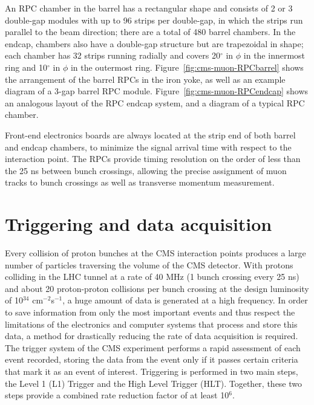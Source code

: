 An RPC chamber in the barrel has a rectangular shape and consists of 2 or 3 double-gap modules with up to 96 strips per double-gap, in which the strips run parallel to the beam direction; there are a total of 480 barrel chambers. In the endcap, chambers also have a double-gap structure but are trapezoidal in shape; each chamber has 32 strips running radially and covers 20$^{\circ}$ in $\phi$ in the innermost ring and 10$^{\circ}$ in $\phi$ in the outermost ring. Figure~\ref{fig:cms-muon-RPCbarrel} shows the arrangement of the barrel RPCs in the iron yoke, as well as an example diagram of a 3-gap barrel RPC module. Figure~\ref{fig:cms-muon-RPCendcap} shows an analogous layout of the RPC endcap system, and a diagram of a typical RPC chamber.

Front-end electronics boards are always located at the strip end of both barrel and endcap chambers, to minimize the signal arrival time with respect to the interaction point. The RPCs provide timing resolution on the order of less than the 25 ns between bunch crossings, allowing the precise assignment of muon tracks to bunch crossings as well as transverse momentum measurement.

\section{Triggering and data acquisition\label{sec:cms-triggerdaq}}
Every collision of proton bunches at the CMS interaction points produces a large number of particles traversing the volume of the CMS detector. With protons colliding in the LHC tunnel at a rate of 40 MHz (1 bunch crossing every 25 ns) and about 20 proton-proton collisions per bunch crossing at the design luminosity of 10$^{34}$ cm$^{-2}$s$^{-1}$, a huge amount of data is generated at a high frequency. In order to save information from only the most important events and thus respect the limitations of the electronics and computer systems that process and store this data, a method for drastically reducing the rate of data acquisition is required. The trigger system of the CMS experiment performs a rapid assessment of each event recorded, storing the data from the event only if it passes certain criteria that mark it as an event of interest. Triggering is performed in two main steps, the Level 1 (L1) Trigger and the High Level Trigger (HLT). Together, these two steps provide a combined rate reduction factor of at least 10$^6$.

